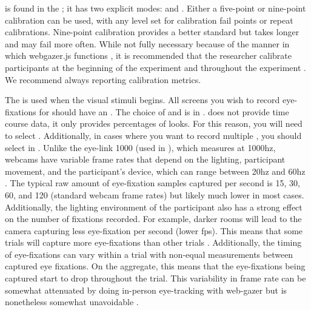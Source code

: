  is found in the ; it has two explicit modes:  and . Either a five-point or nine-point calibration can be used, with any level set for calibration fail points or repeat calibrations. Nine-point calibration provides a better standard but takes longer and may fail more often. While not fully necessary because of the manner in which webgazer.js functions \parencite[e.g.,][]{ Chen_et_al_2001}, it is recommended that the researcher calibrate participants at the beginning of the experiment and throughout the experiment \parencite[][]{Prystauka_Altmann_Rothman_2023}. We recommend always reporting calibration metrics.  

The  is used when the visual stimuli begins. All screens you wish to record eye-fixations for should have an . The choice of  and  is in .  does not provide time course data, it only provides percentages of looks. For this reason, you will need to select . Additionally, in cases where you want to record multiple , you should select   in  . Unlike the eye-link 1000 (used in \parencite{Porretta_et_al_2020}), which measures at 1000hz, webcams have variable frame rates that depend on the lighting, participant movement, and the participant's device, which can range between 20hz and 60hz \parencite{Vos_2017}. The typical raw amount of eye-fixation samples captured per second is 15, 30, 60, and 120 (standard webcam frame rates) but likely much lower in most cases. Additionally, the lighting environment of the participant also has a strong effect on the number of fixations recorded. For example, darker rooms will lead to the camera capturing less eye-fixation per second (lower fps). This means that some trials will capture more eye-fixations than other trials \parencite{Prystauka_Altmann_Rothman_2023}. Additionally, the timing of eye-fixations can vary within a trial with non-equal measurements between captured eye fixations. On the aggregate, this means that the eye-fixations being captured start to drop throughout the trial. This variability in frame rate can be somewhat attenuated by doing in-person eye-tracking with web-gazer but is nonetheless somewhat unavoidable \parencite[e.g., ][]{Papoutsaki}. 

